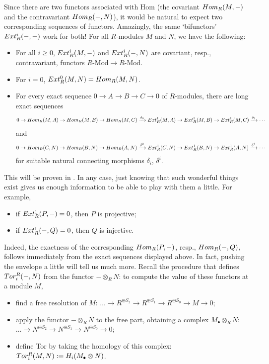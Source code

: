 Since there are two functors associated with Hom (the covariant
$Hom_R(M, -)$ and the contravariant $Hom_R(-, N)$), it would be
natural to expect two corresponding sequences of functors.  Amazingly,
the same `bifunctors' $Ext^i_R(-, -)$ work for both! For all
$R$-modules $M$ and $N$, we have the following:
\begin{itemize}
\item For all $i \geq 0$, $Ext^i_R(M, -)$ and $Ext^i_R(-, N)$ are
  covariant, resp., contravariant, functors
  $R\text{-Mod} \to R\text{-Mod}$.
\item For $i = 0$, $Ext^0_R(M, N) = Hom_R(M, N)$.
\item For every exact sequence $0 \to A \to B \to C \to 0$ of
  $R$-modules, there are long exact sequences
  \begin{gather*}
    0 \to Hom_R(M,A) \to Hom_R(M,B) \to
    Hom_R(M,C) \xrightarrow{\delta_0}
    Ext^1_R(M,A) \to Ext^1_R(M,B) \to
    Ext^1_R(M,C) \xrightarrow{\delta_1} \cdots
  \end{gather*}
  and
  \begin{gather*}
    0 \to Hom_R(C,N) \to Hom_R(B,N) \to
    Hom_R(A,N) \xrightarrow{\delta^0}
    Ext^1_R(C,N) \to Ext^1_R(B,N) \to
    Ext^1_R(A,N) \xrightarrow{\delta^1} \cdots
  \end{gather*}
  for suitable natural connecting morphisms $\delta_i$, $\delta^i$.
\end{itemize}
This will be proven in . In any case, just knowing
that such wonderful things exist gives us enough information to be
able to play with them a little. For example,
\begin{itemize}
\item if $Ext^1_R(P, -) = 0$, then $P$ is projective;
\item if $Ext^1_R(-, Q) = 0$, then $Q$ is injective.
\end{itemize}
Indeed, the exactness of the corresponding $Hom_R(P, -)$, resp.,
$Hom_R(-, Q)$, follows immediately from the exact sequences displayed
above.  In fact, pushing the envelope a little will tell us much
more. Recall the procedure that defines $Tor^R_i(-, N)$ from the
functor $- \otimes_R N$: to compute the value of these functors at a
module $M$,
\begin{itemize}
\item find a free resolution of $M$:
  $\dots \to R^{\oplus S_2} \to R^{\oplus S_1} \to R^{\oplus S_0} \to
  M \to 0$;
\item apply the functor $- \otimes_R N$ to the free part, obtaining a
  complex $M_\bullet \otimes_R N$:
  $\dots \to N^{\oplus S_2} \to N^{\oplus S_1} \to N^{\oplus S_0} \to
  0$;
\item define Tor by taking the homology of this complex:
  $Tor^R_i(M, N) := H_i(M_\bullet \otimes N)$.
\end{itemize}
